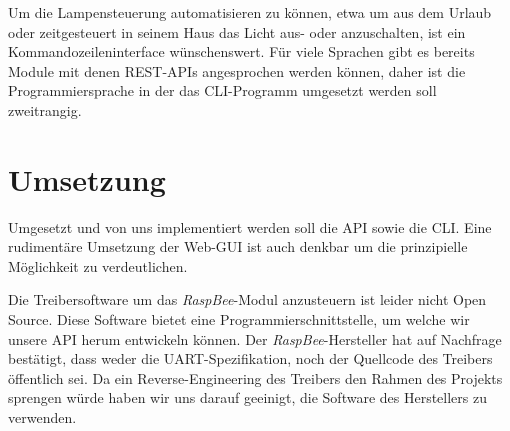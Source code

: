 \documentclass[a4paper,12pt]{article}
\begin{document}
Um die Lampensteuerung automatisieren zu können, etwa um aus dem Urlaub oder
zeitgesteuert in seinem Haus das Licht aus- oder anzuschalten, ist ein
Kommandozeileninterface wünschenswert. Für viele Sprachen gibt es bereits
Module mit denen REST-APIs angesprochen werden können, daher ist die
Programmiersprache in der das CLI-Programm umgesetzt werden soll zweitrangig.

\newpage

\section{Umsetzung}

Umgesetzt und von uns implementiert werden soll die API sowie die CLI. Eine
rudimentäre Umsetzung der Web-GUI ist auch denkbar um die prinzipielle
Möglichkeit zu verdeutlichen.

Die Treibersoftware um das \emph{RaspBee}-Modul anzusteuern ist leider nicht
Open Source. Diese Software bietet eine Programmierschnittstelle, um welche
wir unsere API herum entwickeln können. Der \emph{RaspBee}-Hersteller hat auf
Nachfrage bestätigt, dass weder die UART-Spezifikation, noch der Quellcode
des Treibers öffentlich sei. Da ein Reverse-Engineering des Treibers den Rahmen
des Projekts sprengen würde haben wir uns darauf geeinigt, die Software des
Herstellers zu verwenden.
\end{document}
